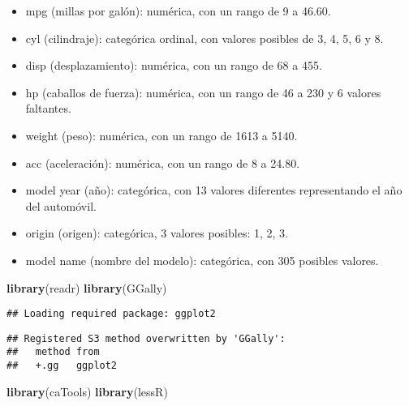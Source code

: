 \documentclass[]{article}
\newenvironment{Shaded}{\begin{snugshade}}{\end{snugshade}}
\newcommand{\KeywordTok}[1]{\textcolor[rgb]{0.13,0.29,0.53}{\textbf{#1}}}
\newcommand{\NormalTok}[1]{#1}
\providecommand{\tightlist}{%
  \setlength{\itemsep}{0pt}\setlength{\parskip}{0pt}}
\begin{document}
\begin{itemize}
\tightlist
\item
  mpg (millas por galón): numérica, con un rango de 9 a 46.60.
\item
  cyl (cilindraje): categórica ordinal, con valores posibles de 3, 4, 5,
  6 y 8.
\item
  disp (desplazamiento): numérica, con un rango de 68 a 455.
\item
  hp (caballos de fuerza): numérica, con un rango de 46 a 230 y 6
  valores faltantes.
\item
  weight (peso): numérica, con un rango de 1613 a 5140.
\item
  acc (aceleración): numérica, con un rango de 8 a 24.80.
\item
  model year (año): categórica, con 13 valores diferentes representando
  el año del automóvil.
\item
  origin (origen): categórica, 3 valores posibles: 1, 2, 3.
\item
  model name (nombre del modelo): categórica, con 305 posibles valores.
\end{itemize}

\begin{Shaded}
\begin{Highlighting}[]
\KeywordTok{library}\NormalTok{(readr)}
\KeywordTok{library}\NormalTok{(GGally)}
\end{Highlighting}
\end{Shaded}

\begin{verbatim}
## Loading required package: ggplot2
\end{verbatim}

\begin{verbatim}
## Registered S3 method overwritten by 'GGally':
##   method from   
##   +.gg   ggplot2
\end{verbatim}

\begin{Shaded}
\begin{Highlighting}[]
\KeywordTok{library}\NormalTok{(caTools)}
\KeywordTok{library}\NormalTok{(lessR)}
\end{Highlighting}
\end{Shaded}
\end{document}
